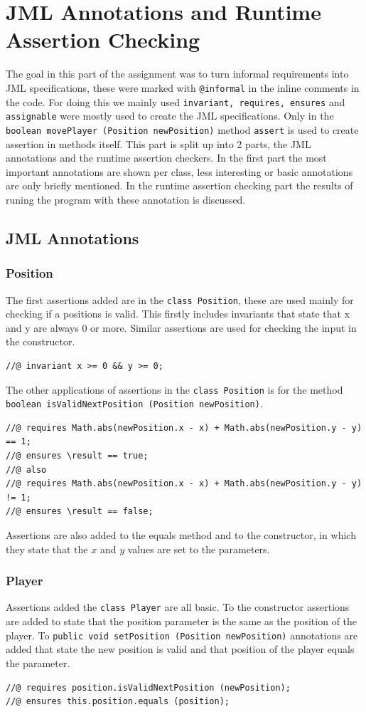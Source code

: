 \documentclass[a4paper]{article}
\begin{document}
	\section{JML Annotations and Runtime Assertion Checking}
	The goal in this part of the assignment was to turn informal requirements into JML specifications, these were marked with \texttt{@informal} in the inline comments in the code. For doing this we mainly used \texttt{invariant, requires, ensures} and \texttt{assignable} were mostly used to create the JML specifications. Only in the \texttt{boolean movePlayer (Position newPosition)} method \texttt{assert} is used to create assertion in methods itself. This part is split up into 2 parts, the JML annotations and the runtime assertion checkers. In the first part the most important annotations are shown per class, less interesting or basic annotations are only briefly mentioned. In the runtime assertion checking part the results of runing the program with these annotation is discussed.

	\subsection{JML Annotations}
	\label{subsec:jmlspec}
	\subsubsection{Position}
	The first assertions added are in the \texttt{class Position}, these are used mainly for checking if a positions is valid. This firstly includes invariants that state that x and y are always 0 or more. Similar assertions are used for checking the input in the constructor.
	\begin{lstlisting}
//@ invariant x >= 0 && y >= 0;
	\end{lstlisting}
	The other applications of assertions in the \texttt{class Position} is for the method \texttt{boolean isValidNextPosition (Position newPosition)}. 
	\begin{lstlisting}
//@ requires Math.abs(newPosition.x - x) + Math.abs(newPosition.y - y) == 1;
//@ ensures \result == true;
//@ also
//@ requires Math.abs(newPosition.x - x) + Math.abs(newPosition.y - y) != 1;
//@ ensures \result == false;
	\end{lstlisting}
	Assertions are also added to the equals method and to the constructor, in which they state that the $x$ and $y$ values are set to the parameters.
	
	\subsubsection{Player}
	Assertions added the \texttt{class Player} are all basic. To the constructor assertions are added to state that the position parameter is the same as the position of the player. To \texttt{public void setPosition (Position newPosition)} annotations are added that state the new position is valid and that position of the player equals the parameter.
	\begin{lstlisting}
//@ requires position.isValidNextPosition (newPosition);
//@ ensures this.position.equals (position);
	\end{lstlisting} 
	
\end{document}
